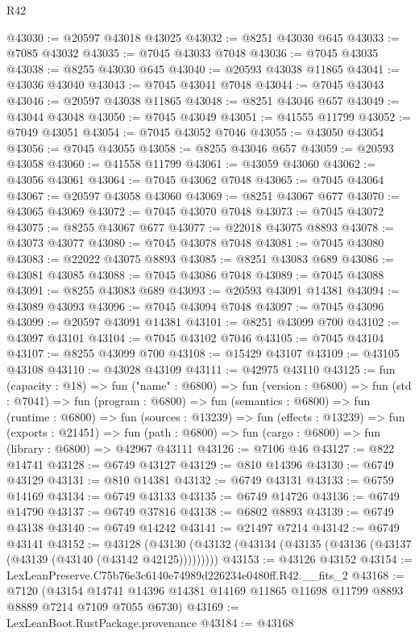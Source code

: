 \begin{lexlean}{R42}
\begin{coremodule}
{@43030 := @20597 @43018 @43025
@43032 := @8251 @43030 @645
@43033 := @7085 @43032
@43035 := @7045 @43033 @7048
@43036 := @7045 @43035
@43038 := @8255 @43030 @645
@43040 := @20593 @43038 @11865
@43041 := @43036 @43040
@43043 := @7045 @43041 @7048
@43044 := @7045 @43043
@43046 := @20597 @43038 @11865
@43048 := @8251 @43046 @657
@43049 := @43044 @43048
@43050 := @7045 @43049
@43051 := @41555 @11799
@43052 := @7049 @43051
@43054 := @7045 @43052 @7046
@43055 := @43050 @43054
@43056 := @7045 @43055
@43058 := @8255 @43046 @657
@43059 := @20593 @43058
@43060 := @41558 @11799
@43061 := @43059 @43060
@43062 := @43056 @43061
@43064 := @7045 @43062 @7048
@43065 := @7045 @43064
@43067 := @20597 @43058 @43060
@43069 := @8251 @43067 @677
@43070 := @43065 @43069
@43072 := @7045 @43070 @7048
@43073 := @7045 @43072
@43075 := @8255 @43067 @677
@43077 := @22018 @43075 @8893
@43078 := @43073 @43077
@43080 := @7045 @43078 @7048
@43081 := @7045 @43080
@43083 := @22022 @43075 @8893
@43085 := @8251 @43083 @689
@43086 := @43081 @43085
@43088 := @7045 @43086 @7048
@43089 := @7045 @43088
@43091 := @8255 @43083 @689
@43093 := @20593 @43091 @14381
@43094 := @43089 @43093
@43096 := @7045 @43094 @7048
@43097 := @7045 @43096
@43099 := @20597 @43091 @14381
@43101 := @8251 @43099 @700
@43102 := @43097 @43101
@43104 := @7045 @43102 @7046
@43105 := @7045 @43104
@43107 := @8255 @43099 @700
@43108 := @15429 @43107
@43109 := @43105 @43108
@43110 := @43028 @43109
@43111 := @42975 @43110
@43125 := fun (capacity : @18) =>
  fun ("name" : @6800) =>
  fun (version : @6800) =>
  fun (std : @7041) =>
  fun (program : @6800) =>
  fun (semantics : @6800) =>
  fun (runtime : @6800) =>
  fun (sources : @13239) =>
  fun (effects : @13239) =>
  fun (exports : @21451) =>
  fun (path : @6800) => fun (cargo : @6800) => fun (library : @6800) => @42967 @43111
@43126 := @7106 @46
@43127 := @822 @14741
@43128 := @6749 @43127
@43129 := @810 @14396
@43130 := @6749 @43129
@43131 := @810 @14381
@43132 := @6749 @43131
@43133 := @6759 @14169
@43134 := @6749 @43133
@43135 := @6749 @14726
@43136 := @6749 @14790
@43137 := @6749 @37816
@43138 := @6802 @8893
@43139 := @6749 @43138
@43140 := @6749 @14242
@43141 := @21497 @7214
@43142 := @6749 @43141
@43152 := @43128
    (@43130 (@43132 (@43134 (@43135 (@43136 (@43137 (@43139 (@43140 (@43142 @42125)))))))))
@43153 := @43126 @43152
@43154 := LexLeanPreserve.C75b76e3c6140e74989d226234e0480ff.R42.__fits_2
@43168 := @7120
    (@43154 @14741 @14396 @14381 @14169 @11865 @11698 @11799 @8893 @8889 @7214 @7109 @7055 @6730)
@43169 := LexLeanBoot.RustPackage.provenance
@43184 := @43168
}
\end{coremodule}
\end{lexlean}
